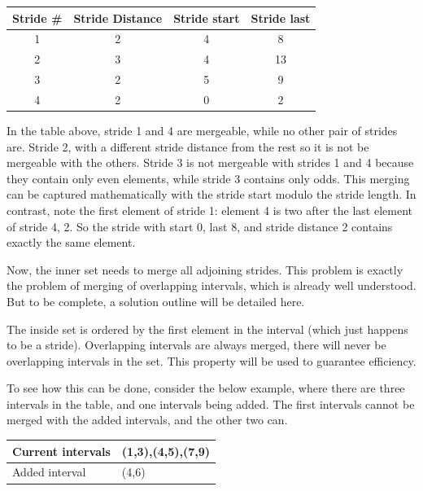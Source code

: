 \documentclass[12pt,twoside]{reedthesis}
\begin{document}
			\begin{tabular}{ |c||c|c|c| } 
				\hline
				Stride \# & Stride Distance & Stride start & Stride last \\ 
				\hline
				\hline
				1 & 2 & 4 & 8 \\ \hline
				2 & 3 & 4 & 13 \\ \hline
				3 & 2  & 5  & 9 \\ \hline
				4 & 2  & 0  & 2 \\ 
				\hline
			\end{tabular}
		
			In the table above, stride 1 and 4 are mergeable, while no other pair of strides are. 
			Stride 2, with a different stride distance from the rest so it is not be mergeable with the others. Stride 3 is not mergeable with strides 1 and 4 because they contain only even elements, while stride 3 contains only odds. This merging can be captured mathematically with the stride start modulo the stride length. In contrast, note the first element of stride 1: element 4 is two after the last element of stride 4, 2. So the stride with start 0, last 8, and stride distance 2 contains exactly the same element. %
			
			Now, the inner set needs to merge all adjoining strides. This problem is exactly the problem of merging of overlapping intervals, which is already well understood. But to be complete, a solution outline will be detailed here. %
			
			The inside set is ordered by the first element in the interval (which just happens to be a stride). Overlapping intervals are always merged, there will never be overlapping intervals in the set. This property will be used to guarantee efficiency.
			
			To see how this can be done, consider the below example, where there are three intervals in the table, and one intervals being added. The first intervals cannot be merged with the added intervals, and the other two can. 
			
			\newcommand{\bcl}{\cellcolor{black!50}}
			\begin{tabular}{ |l|l| } 
				\hline
				Current intervals & (1,3),(4,5),(7,9) \\ 
				\hline
				Added interval & (4,6) \\ 
				\hline
			\end{tabular}
			
\end{document}
